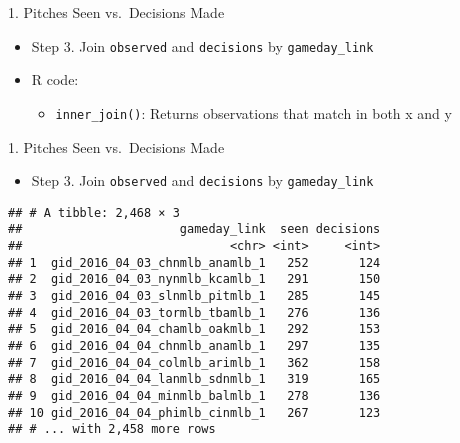\begin{frame}[fragile]{1. Pitches Seen vs.~Decisions Made}

\begin{itemize}
\tightlist
\item
  Step 3. Join \texttt{observed} and \texttt{decisions} by
  \texttt{gameday\_link}
\item
  R code:

  \begin{itemize}
  \tightlist
  \item
    \texttt{inner\_join()}: Returns observations that match in both x
    and y
  \end{itemize}
\end{itemize}

\footnotesize

\begin{Shaded}
\begin{Highlighting}[]
\StringTok{ } \NormalTok{)}
\end{Highlighting}
\end{Shaded}

\end{frame}

\begin{frame}[fragile]{1. Pitches Seen vs.~Decisions Made}

\begin{itemize}
\tightlist
\item
  Step 3. Join \texttt{observed} and \texttt{decisions} by
  \texttt{gameday\_link}
\end{itemize}

\footnotesize

\begin{Shaded}
\begin{Highlighting}[]
\StringTok{ } \NormalTok{))}
\end{Highlighting}
\end{Shaded}

\begin{verbatim}
## # A tibble: 2,468 × 3
##                      gameday_link  seen decisions
##                             <chr> <int>     <int>
## 1  gid_2016_04_03_chnmlb_anamlb_1   252       124
## 2  gid_2016_04_03_nynmlb_kcamlb_1   291       150
## 3  gid_2016_04_03_slnmlb_pitmlb_1   285       145
## 4  gid_2016_04_03_tormlb_tbamlb_1   276       136
## 5  gid_2016_04_04_chamlb_oakmlb_1   292       153
## 6  gid_2016_04_04_chnmlb_anamlb_1   297       135
## 7  gid_2016_04_04_colmlb_arimlb_1   362       158
## 8  gid_2016_04_04_lanmlb_sdnmlb_1   319       165
## 9  gid_2016_04_04_minmlb_balmlb_1   278       136
## 10 gid_2016_04_04_phimlb_cinmlb_1   267       123
## # ... with 2,458 more rows
\end{verbatim}

\end{frame}

